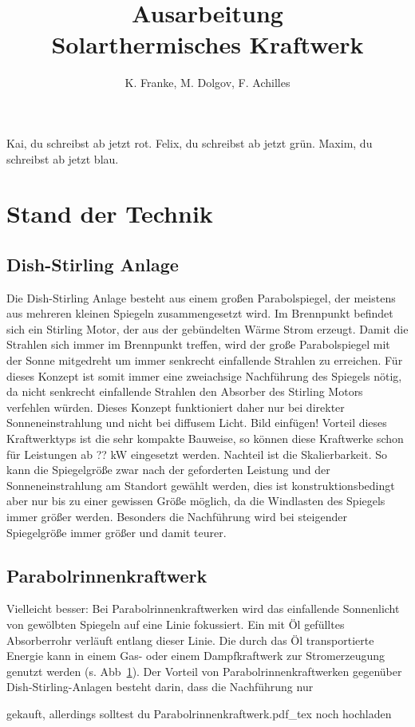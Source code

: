 \documentclass[fontsize=10pt,paper=a4,bibliography=totoc]{scrartcl}
\title{Ausarbeitung\\Solarthermisches Kraftwerk}
\author{K. Franke, M. Dolgov, F. Achilles}
\newcommand{\kai}[1]{{ \color{red} #1 }}
\newcommand{\felix}[1]{{ \color{green} #1}}
\newcommand{\maxim}[1]{{ \color{blue} #1}}
\begin{document}
\maketitle
%
\kai{Kai, du schreibst ab jetzt rot.}\newline
\felix{Felix, du schreibst ab jetzt grün.}\newline
\maxim{Maxim, du schreibst ab jetzt blau.}\newline

\section{Stand der Technik}

\subsection{Dish-Stirling Anlage}
Die Dish-Stirling Anlage besteht aus einem großen Parabolspiegel, der meistens aus mehreren kleinen Spiegeln zusammengesetzt wird. Im Brennpunkt befindet sich ein Stirling Motor, der aus der gebündelten Wärme Strom erzeugt. Damit die Strahlen sich immer im Brennpunkt treffen, wird der große Parabolspiegel mit der Sonne mitgedreht um immer senkrecht einfallende Strahlen zu erreichen. Für dieses Konzept ist somit immer eine zweiachsige Nachführung des Spiegels nötig, da nicht senkrecht einfallende Strahlen den Absorber des Stirling Motors verfehlen würden. Dieses Konzept funktioniert daher nur bei direkter Sonneneinstrahlung und nicht bei diffusem Licht. Bild einfügen! Vorteil dieses Kraftwerktyps ist die sehr kompakte Bauweise, so können diese Kraftwerke schon für Leistungen ab ??
 kW eingesetzt werden. Nachteil ist die Skalierbarkeit. So kann die Spiegelgröße zwar nach der geforderten Leistung und der Sonneneinstrahlung am Standort gewählt werden, dies ist konstruktionsbedingt aber nur bis zu einer gewissen Größe möglich, da die Windlasten des Spiegels immer größer werden. Besonders die Nachführung wird bei steigender Spiegelgröße immer größer und damit teurer.
 
\subsection{Parabolrinnenkraftwerk}

\maxim{Vielleicht besser: Bei Parabolrinnenkraftwerken wird das einfallende Sonnenlicht von gewölbten Spiegeln auf eine Linie fokussiert. Ein mit Öl gefülltes Absorberrohr verläuft entlang dieser Linie. Die durch das Öl transportierte Energie kann in einem Gas- oder einem Dampfkraftwerk zur Stromerzeugung genutzt werden (s. Abb~\ref{pic:parabolrinnen}). Der Vorteil von Parabolrinnenkraftwerken gegenüber Dish-Stirling-Anlagen besteht darin, dass die Nachführung nur 
\begin{figure}[h]
	\centering
	\def\svgwidth{.6\textwidth}
	
	\label{pic:parabolrinnen}
\end{figure}
}\hfill\newline\newline
\kai{gekauft, allerdings solltest du Parabolrinnenkraftwerk.pdf_tex noch hochladen}
\end{document}
